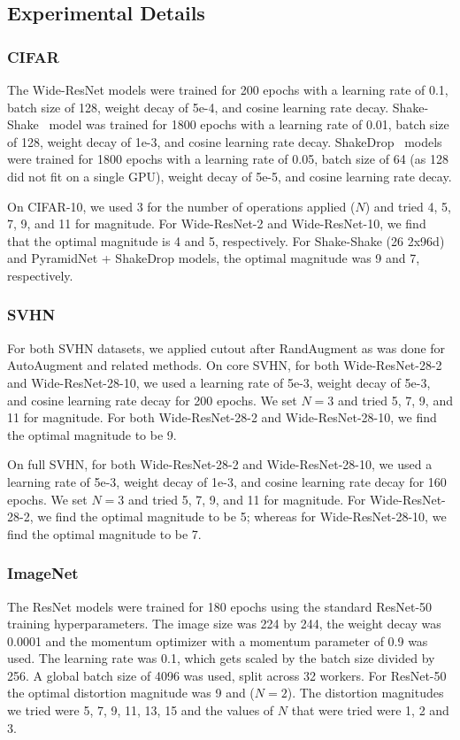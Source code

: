 \subsection{Experimental Details}
\label{experimental_details}
\subsubsection{CIFAR}
The Wide-ResNet models were trained for 200 epochs with a learning rate of 0.1, batch size of 128, weight decay of 5e-4, and cosine learning rate decay. Shake-Shake~\cite{gastaldi2017shake} model was trained for 1800 epochs with a learning rate of 0.01, batch size of 128, weight decay of 1e-3, and cosine learning rate decay. ShakeDrop~\cite{yamada2018shakedrop} models were trained for 1800 epochs with a learning rate of 0.05, batch size of 64 (as 128 did not fit on a single GPU), weight decay of 5e-5, and cosine learning rate decay.   

On CIFAR-10, we used 3 for the number of operations applied ($N$) and tried 4, 5, 7, 9, and 11 for magnitude. For Wide-ResNet-2 and Wide-ResNet-10, we find that the optimal magnitude is 4 and 5, respectively. For Shake-Shake (26 2x96d) and PyramidNet + ShakeDrop models, the optimal magnitude was 9 and 7, respectively.   
\subsubsection{SVHN}
For both SVHN datasets, we applied cutout after RandAugment as was done for AutoAugment and related methods. On core SVHN, for both Wide-ResNet-28-2 and Wide-ResNet-28-10, we used a learning rate of 5e-3, weight decay of 5e-3, and cosine learning rate decay for 200 epochs. We set $N=3$ and tried 5, 7, 9, and 11 for magnitude. For both Wide-ResNet-28-2 and Wide-ResNet-28-10, we find the optimal magnitude to be 9.  

On full SVHN, for both Wide-ResNet-28-2 and Wide-ResNet-28-10, we used a learning rate of 5e-3, weight decay of 1e-3, and cosine learning rate decay for 160 epochs. We set $N=3$ and tried 5, 7, 9, and 11 for magnitude. For Wide-ResNet-28-2, we find the optimal magnitude to be 5; whereas for Wide-ResNet-28-10, we find the optimal magnitude to be 7.  
\subsubsection{ImageNet}
The ResNet models were trained for 180 epochs using the standard ResNet-50 training hyperparameters. The image size was 224 by 244, the weight decay was 0.0001 and the momentum optimizer with a momentum parameter of 0.9 was used. The learning rate was 0.1, which gets scaled by the batch size divided by 256.
A global batch size of 4096 was used, split across 32 workers. For ResNet-50 the optimal distortion magnitude was 9 and ($N=2$). The distortion magnitudes we tried were 5, 7, 9, 11, 13, 15 and the values of $N$ that were tried were 1, 2 and 3.


